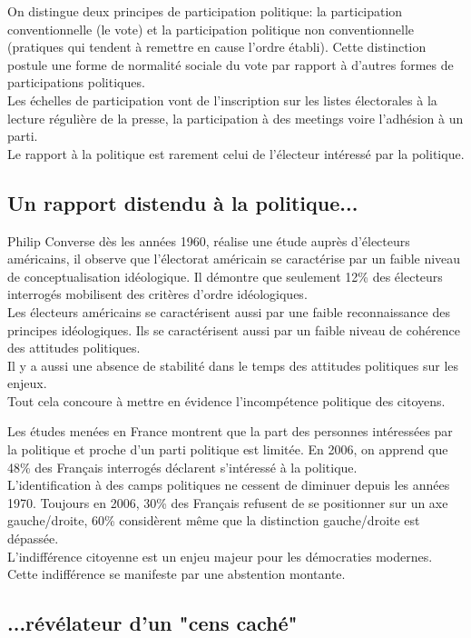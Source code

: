 \documentclass[12pt, a4paper, openany]{book}
\begin{document}
On distingue deux principes de participation politique: la participation conventionnelle (le vote) et la participation politique non conventionnelle (pratiques qui tendent à remettre en cause l'ordre établi). Cette distinction postule une forme de normalité sociale du vote par rapport à d'autres formes de participations politiques. \\
Les échelles de participation vont de l'inscription sur les listes électorales à la lecture régulière de la presse, la participation à des meetings voire l'adhésion à un parti. \\
Le rapport à la politique est rarement celui de l'électeur intéressé par la politique. 


\subsection{Un rapport distendu à la politique...}

Philip Converse dès les années 1960, réalise une étude auprès d'électeurs américains, il observe que l'électorat américain se caractérise par un faible niveau de conceptualisation idéologique. Il démontre que seulement 12\% des électeurs interrogés mobilisent des critères d'ordre idéologiques. \\
Les électeurs américains se caractérisent aussi par une faible reconnaissance des principes idéologiques. Ils se caractérisent aussi par un faible niveau de cohérence des attitudes politiques. \\
Il y a aussi une absence de stabilité dans le temps des attitudes politiques sur les enjeux. \\
Tout cela concoure à mettre en évidence l'incompétence politique des citoyens. 


Les études menées en France montrent que la part des personnes intéressées par la politique et proche d'un parti politique est limitée. En 2006, on apprend que 48\% des Français interrogés déclarent s'intéressé à la politique. \\
L'identification à des camps politiques ne cessent de diminuer depuis les années 1970. Toujours en 2006, 30\% des Français refusent de se positionner sur un axe gauche/droite, 60\% considèrent même que la distinction gauche/droite est dépassée. \\
L'indifférence citoyenne est un enjeu majeur pour les démocraties modernes. Cette indifférence se manifeste par une abstention montante.


\subsection{...révélateur d'un "cens caché"}
\end{document}
